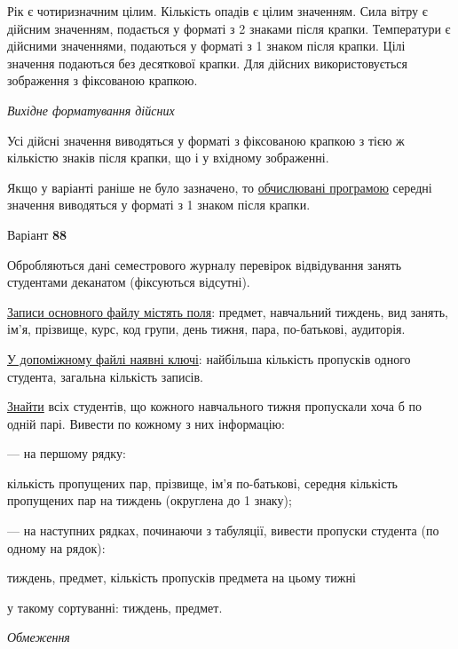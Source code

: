 \documentclass[11pt, ukrainian]{article}
\begin{document}
Рік є чотиризначним цілим.
Кількість опадів є цілим значенням.
Сила вітру є дійсним значенням, подається у форматі з 2 знаками після крапки.
Температури є дійсними значеннями, подаються у форматі з 1 знаком після крапки.
Цілі значення подаються без десяткової крапки.
Для дійсних використовується зображення з фіксованою крапкою.

\textit{Вихідне форматування дійсних}

Усі дійсні значення виводяться у форматі з фіксованою крапкою з тією ж кількістю знаків після крапки, що і у вхідному зображенні.

Якщо у варіанті раніше не було зазначено, то \underline{обчислювані програмою} середні значення виводяться у форматі з 1 знаком після крапки.




\par
\newpage
{\center Варіант  \No \textbf { 88 }\par}
\bigskip
Обробляються дані семестрового журналу перевірок відвідування занять студентами деканатом (фіксуються відсутні). 

\underline{Записи основного файлу містять поля}: предмет, навчальний тиждень, вид занять, ім’я, прізвище, курс, код групи, день тижня, пара, по-батькові, аудиторія.

\underline{У допоміжному файлі наявні ключі}: найбільша кількість пропусків одного студента, загальна кількість записів.

\underline{Знайти} всіх студентів, що кожного навчального тижня пропускали хоча б по одній парі. Вивести по кожному з них інформацію:\par
{\noindent}--- на першому рядку:\par
кількість пропущених пар, прізвище, ім’я по-батькові, середня кількість пропущених пар на тиждень (округлена до 1 знаку);

{\noindent}--- на наступних рядках, починаючи з табуляції, вивести пропуски студента (по одному на рядок):\par
тиждень, предмет, кількість пропусків предмета на цьому тижні

{\noindent}у такому сортуванні: тиждень, предмет.


\bigskip\textit{Обмеження}
\end{document}
